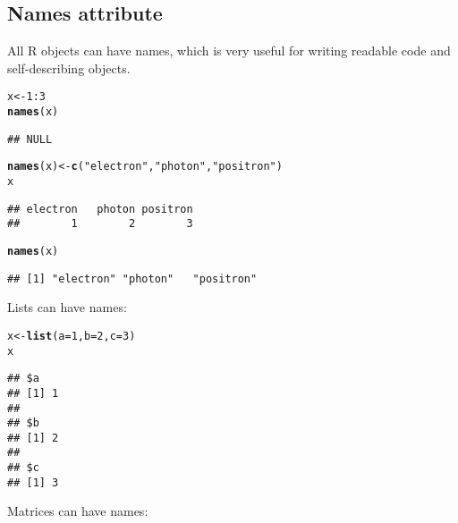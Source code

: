 \documentclass[10pt,a4paper,twoside]{article}\usepackage[]{graphicx}\usepackage[]{xcolor}
\makeatletter
\newcommand{\hlnum}[1]{\textcolor[rgb]{0.686,0.059,0.569}{#1}}%
\newcommand{\hlsng}[1]{\textcolor[rgb]{0.192,0.494,0.8}{#1}}%
\newcommand{\hlopt}[1]{\textcolor[rgb]{0,0,0}{#1}}%
\newcommand{\hldef}[1]{\textcolor[rgb]{0.345,0.345,0.345}{#1}}%
\newcommand{\hlkwb}[1]{\textcolor[rgb]{0.69,0.353,0.396}{#1}}%
\newcommand{\hlkwc}[1]{\textcolor[rgb]{0.333,0.667,0.333}{#1}}%
\newcommand{\hlkwd}[1]{\textcolor[rgb]{0.737,0.353,0.396}{\textbf{#1}}}%
\newenvironment{kframe}{%
 \def\at@end@of@kframe{}%
 \ifinner\ifhmode%
  \def\at@end@of@kframe{\end{minipage}}%
  \begin{minipage}{\columnwidth}%
 \fi\fi%
 \def\FrameCommand##1{\hskip\@totalleftmargin \hskip-\fboxsep
 \colorbox{shadecolor}{##1}\hskip-\fboxsep
     \hskip-\linewidth \hskip-\@totalleftmargin \hskip\columnwidth}%
 \MakeFramed {\advance\hsize-\width
   \@totalleftmargin\z@ \linewidth\hsize
   \@setminipage}}%
 {\par\unskip\endMakeFramed%
 \at@end@of@kframe}
\newenvironment{knitrout}{}{} %
\makeatother
\begin{document}
\subsection{Names attribute}

All R objects can have names, which is very useful for writing readable code and self-describing objects.

\begin{knitrout}
\color{fgcolor}\begin{kframe}
\begin{alltt}
\hldef{x} \hlkwb{<-} \hlnum{1}\hlopt{:}\hlnum{3}
\hlkwd{names}\hldef{(x)}
\end{alltt}
\begin{verbatim}
## NULL
\end{verbatim}
\begin{alltt}
\hlkwd{names}\hldef{(x)} \hlkwb{<-} \hlkwd{c}\hldef{(}\hlsng{"electron"}\hldef{,} \hlsng{"photon"}\hldef{,} \hlsng{"positron"}\hldef{)}
\hldef{x}
\end{alltt}
\begin{verbatim}
## electron   photon positron 
##        1        2        3
\end{verbatim}
\begin{alltt}
\hlkwd{names}\hldef{(x)}
\end{alltt}
\begin{verbatim}
## [1] "electron" "photon"   "positron"
\end{verbatim}
\end{kframe}
\end{knitrout}

Lists can have names:

\begin{knitrout}
\color{fgcolor}\begin{kframe}
\begin{alltt}
\hldef{x} \hlkwb{<-} \hlkwd{list}\hldef{(}\hlkwc{a} \hldef{=} \hlnum{1}\hldef{,} \hlkwc{b} \hldef{=} \hlnum{2}\hldef{,} \hlkwc{c} \hldef{=} \hlnum{3}\hldef{)}
\hldef{x}
\end{alltt}
\begin{verbatim}
## $a
## [1] 1
## 
## $b
## [1] 2
## 
## $c
## [1] 3
\end{verbatim}
\end{kframe}
\end{knitrout}

Matrices can have names:
\end{document}
